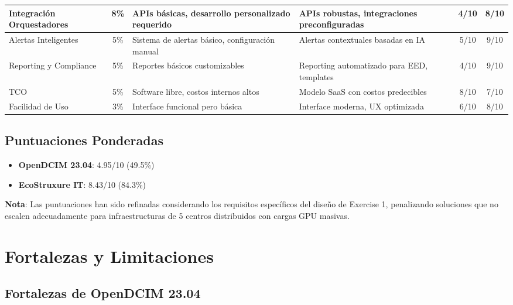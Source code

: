 \documentclass[12pt,a4paper]{article}
\begin{document}
\begin{longtable}{|p{3cm}|c|p{3.5cm}|p{3.5cm}|c|c|}
Integración Orquestadores & 8\% & APIs básicas, desarrollo personalizado requerido & APIs robustas, integraciones preconfiguradas & 4/10 & 8/10 \\
\hline

Alertas Inteligentes & 5\% & Sistema de alertas básico, configuración manual & Alertas contextuales basadas en IA & 5/10 & 9/10 \\
\hline

Reporting y Compliance & 5\% & Reportes básicos customizables & Reporting automatizado para EED, templates & 4/10 & 9/10 \\
\hline

TCO & 5\% & Software libre, costos internos altos & Modelo SaaS con costos predecibles & 8/10 & 7/10 \\
\hline

Facilidad de Uso & 3\% & Interface funcional pero básica & Interface moderna, UX optimizada & 6/10 & 8/10 \\
\hline

\end{longtable}

\subsection{Puntuaciones Ponderadas}

\begin{itemize}
    \item \textbf{OpenDCIM 23.04}: 4.95/10 (49.5\%)
    \item \textbf{EcoStruxure IT}: 8.43/10 (84.3\%)
\end{itemize}

\textbf{Nota}: Las puntuaciones han sido refinadas considerando los requisitos específicos del diseño de Exercise 1, penalizando soluciones que no escalen adecuadamente para infraestructuras de 5 centros distribuidos con cargas GPU masivas.

\section{Fortalezas y Limitaciones}

\subsection{Fortalezas de OpenDCIM 23.04}
\end{document}
